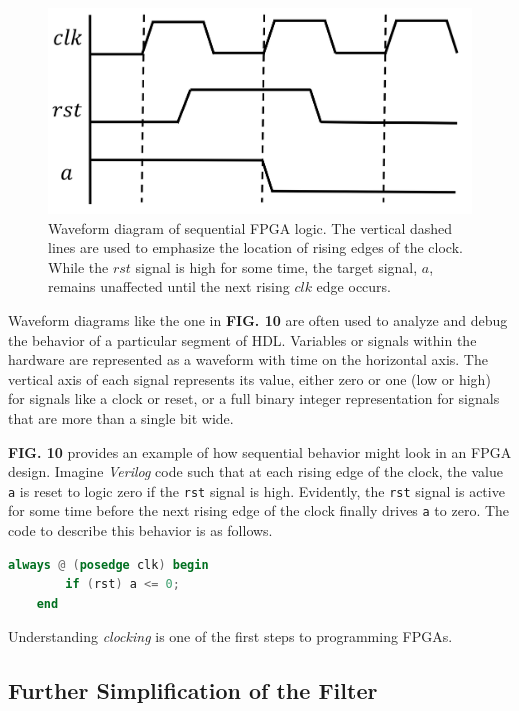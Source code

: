 \documentclass[reprint,amsmath,amssymb]{revtex4-2}
\begin{document}
\begin{figure}
    \centering
    \includegraphics[width=\linewidth]{figs/logic_signals.png}
    \caption{Waveform diagram of sequential FPGA logic. The vertical dashed lines are used to emphasize the location of rising edges of the clock. While the $rst$ signal is high for some time, the target signal, $a$, remains unaffected until the next rising $clk$ edge occurs.}
    \label{fig:10}
\end{figure}

Waveform diagrams like the one in \textbf{FIG. 10} are often used to analyze and debug the behavior of a particular segment of HDL. Variables or signals within the hardware are represented as a waveform with time on the horizontal axis. The vertical axis of each signal represents its value, either zero or one (low or high) for signals like a clock or reset, or a full binary integer representation for signals that are more than a single bit wide. 

\textbf{FIG. 10} provides an example of how sequential behavior might look in an FPGA design. Imagine \textit{Verilog} code such that at each rising edge of the clock, the value \verb+a+ is reset to logic zero if the \verb+rst+ signal is high. Evidently, the \verb+rst+ signal is active for some time before the next rising edge of the clock finally drives \verb+a+ to zero. The code to describe this behavior is as follows.
\begin{lstlisting}[language=Verilog]
    always @ (posedge clk) begin
        if (rst) a <= 0;
    end
\end{lstlisting}

Understanding \textit{clocking} is one of the first steps to programming FPGAs.

\subsection{Further Simplification of the Filter}
\end{document}
